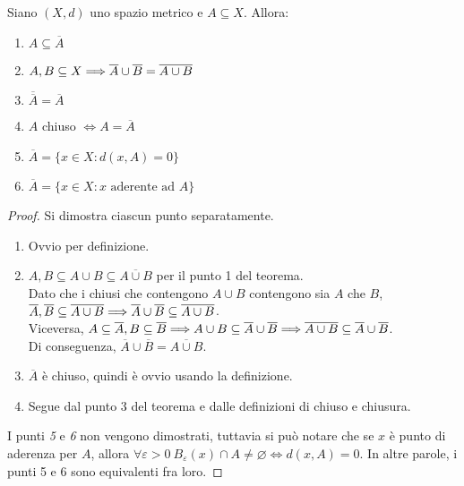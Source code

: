 \begin{theorem}
    \label{thm:chiusura}
    Siano $(X,d)$ uno spazio metrico e $A \subseteq X$. Allora:
    \begin{enumerate}
        \item $A \subseteq \overline A$
        \item $A, B \subseteq X \Longrightarrow \overline{A} \cup \overline{B} = \overline{A \cup B}$
        \item $\overline{\overline{A}} = \overline{A}$
        \item $A$ chiuso $\iff A = \overline{A}$
        \item $\overline{A} = \{x\in X : d(x,A) = 0\}$
        \item $\overline{A} = \{x \in X : x\text{ aderente ad }A\}$
    \end{enumerate}
\end{theorem}

\begin{proof} Si dimostra ciascun punto separatamente.
    \begin{enumerate}
        \item Ovvio per definizione.
        \item $A, B \subseteq A \cup B \subseteq \overline{A \cup B}$ per il punto 1 del teorema.\\
        Dato che i chiusi che contengono $A \cup B$ contengono sia $A$ che $B$, $\overline A, \overline B \subseteq \overline{A \cup B} \Longrightarrow \overline A \cup \overline B \subseteq \overline{A \cup B}$.\\
        Viceversa, $A \subseteq \overline{A}, B \subseteq \overline{B} \Longrightarrow A \cup B \subseteq \overline{A} \cup \overline{B} \Longrightarrow \overline{A \cup B} \subseteq \overline{A} \cup \overline{B}$.\\
        Di conseguenza, $\overline{A} \cup \overline{B} = \overline{A \cup B}$.
        \item $\overline{A}$ è chiuso, quindi è ovvio usando la definizione.
        \item Segue dal punto 3 del teorema e dalle definizioni di chiuso e chiusura.
    \end{enumerate}
    I punti \textit{5} e \textit{6} non vengono dimostrati, tuttavia si può notare che se $x$ è punto di aderenza per $A$, allora $\forall \varepsilon > 0 \ B_\varepsilon(x) \cap A \neq \varnothing \iff d(x,A)=0$. In altre parole, i punti 5 e 6 sono equivalenti fra loro.
\end{proof}

